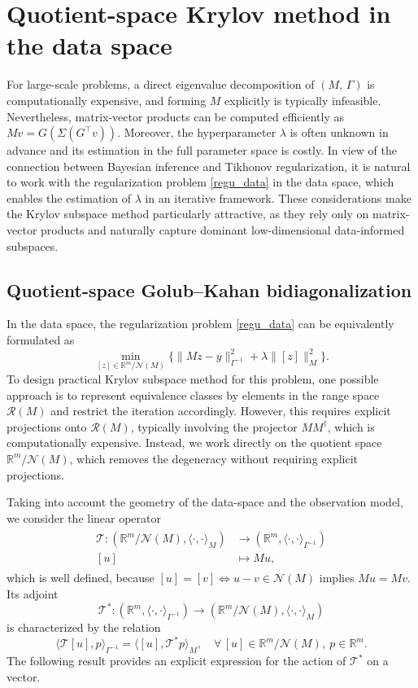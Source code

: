 \documentclass[]{myarticle}
\begin{document}
\section{Quotient-space Krylov method in the data space} \label{sec3}
For large-scale problems, a direct eigenvalue decomposition of $(M,\,\Gamma)$ is computationally expensive, and forming $M$ explicitly is typically infeasible. Nevertheless, matrix-vector products can be computed efficiently as $Mv = G(\Sigma(G^\top v))$. Moreover, the hyperparameter $\lambda$ is often unknown in advance and its estimation in the full parameter space is costly. In view of the connection between Bayesian inference and Tikhonov regularization, it is natural to work with the regularization problem \cref{regu_data} in the data space, which enables the estimation of $\lambda$ in an iterative framework. These considerations make the Krylov subspace method particularly attractive, as they rely only on matrix-vector products and naturally capture dominant low-dimensional data-informed subspaces.

\subsection{Quotient-space Golub--Kahan bidiagonalization}
In the data space, the regularization problem \cref{regu_data} can be equivalently formulated as
\begin{equation}\label{regu_quot}
  \min_{[z]\in\mathbb{R}^{m}/\mathcal{N}(M)}\{\|Mz-y\|_{\Gamma^{-1}}^2 + \lambda\|[z]\|_{M}^2 \}.
\end{equation}
To design practical Krylov subspace method for this problem, one possible approach is to represent equivalence classes by elements in the range space $\mathcal R(M)$ and restrict the iteration accordingly. However, this requires explicit projections onto $\mathcal R(M)$, typically involving the projector $MM^\dagger$, which is computationally expensive. Instead, we work directly on the quotient space $\mathbb R^m/\mathcal N(M)$, which removes the degeneracy without requiring explicit projections. 

Taking into account the geometry of the data-space and the observation model, we consider the linear operator
\begin{align}\label{eq:TM-def}
  \begin{split}
  \mathcal T : (\mathbb R^m/\mathcal N(M),\langle\cdot,\cdot\rangle_M) 
  &\longrightarrow (\mathbb R^m,\langle\cdot,\cdot\rangle_{\Gamma^{-1}}) \\
  [u] &\longmapsto Mu,
  \end{split}
\end{align}
which is well defined, because $[u]=[v] \Leftrightarrow  u-v\in\mathcal N(M)$ implies $Mu=Mv$.
Its adjoint
\[\mathcal T^* : (\mathbb R^m,\langle\cdot,\cdot\rangle_{\Gamma^{-1}}) \longrightarrow  (\mathbb R^m/\mathcal N(M),\langle\cdot,\cdot\rangle_M) \]
is characterized by the relation
\[\langle \mathcal T[u], p\rangle_{\Gamma^{-1}}=
\langle [u], \mathcal T^\ast p\rangle_M, \quad \forall \, [u]\in \mathbb R^m/\mathcal N(M),\ p\in \mathbb R^m. \]
The following result provides an explicit expression for the action of $\mathcal T^\ast$ on a vector.
\end{document}
